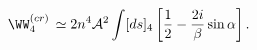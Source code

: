 \begin{equation}  
\label{piccolo}
\WW_4^{(cr)} \, \simeq 2n^4{\cal A}^2 \int [ds]_4
\left[\frac{1}{2}-\frac{2i}{\beta}\sin\alpha\right].
\end{equation}

